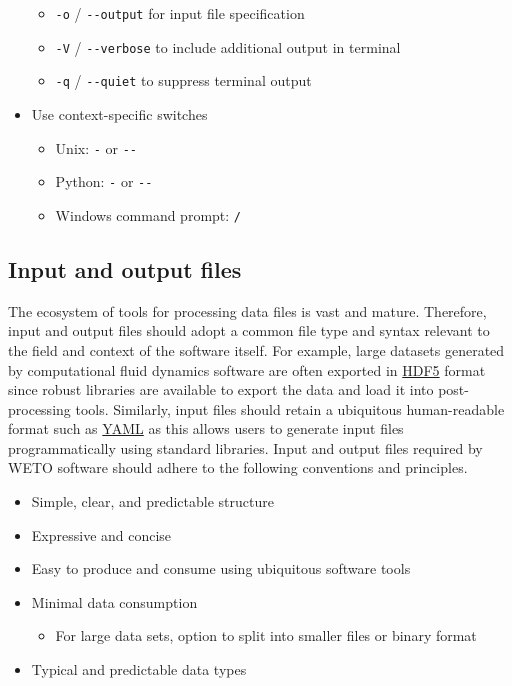 \documentclass[]{nrel}
\begin{document}
\begin{itemize}
\begin{itemize}
\item \lstinline{-o} / \lstinline{--output} for input file specification

\item \lstinline{-V} / \lstinline{--verbose} to include additional output in terminal

\item \lstinline{-q} / \lstinline{--quiet} to suppress terminal output

\end{itemize}

\item Use context-specific switches
\begin{itemize}
\item Unix: \lstinline{-} or \lstinline{--}

\item Python: \lstinline{-} or \lstinline{--}

\item Windows command prompt: \lstinline{/}

\end{itemize}

\end{itemize}


\subsection{Input and output files}
The ecosystem of tools for processing data files is vast and mature.
Therefore, input and output files should adopt a common file type and syntax relevant to the
field and context of the software itself.
For example, large datasets generated by computational fluid dynamics software are often
exported in \href{https://www.hdfgroup.org/solutions/hdf5/}{HDF5} format since robust
libraries are available to export the data and load it into post-processing tools.
Similarly, input files should retain a ubiquitous human-readable format such as
\href{https://yaml.org}{YAML} as this allows users to generate input files programmatically
using standard libraries. Input and output files required by WETO software should
adhere to the following conventions and principles.
\begin{itemize}
\item Simple, clear, and predictable structure

\item Expressive and concise

\item Easy to produce and consume using ubiquitous software tools

\item Minimal data consumption
\begin{itemize}
\item For large data sets, option to split into smaller files or binary format

\end{itemize}

\item Typical and predictable data types

\end{itemize}
\end{document}
